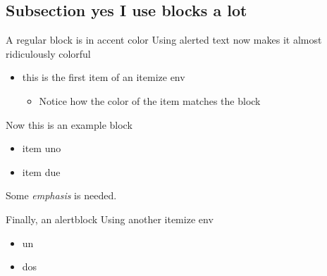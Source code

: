 \documentclass[hyperref={draft}]{beamer}
\begin{document}
\subsection{Subsection yes I use blocks a lot}
\begin{frame}
  \begin{block}{A regular block is in accent color}
    Using \alert{alerted text} now makes it almost ridiculously colorful
    \begin{itemize}
      \item this is the first item of an itemize env
        \begin{itemize}
          \item Notice how the color of the item matches the block
        \end{itemize}
    \end{itemize}
  \end{block}
  \pause
  \begin{exampleblock}{Now this is an example block}
    \begin{itemize}
      \item item uno
      \item item due
    \end{itemize}
    Some \emph{emphasis} is needed.
  \end{exampleblock}
  \pause
  \begin{alertblock}{Finally, an alertblock}
    Using another itemize env
    \begin{itemize}
      \item un
      \item dos
    \end{itemize}
  \end{alertblock}

  
\end{frame}
\end{document}
